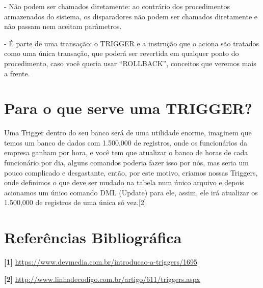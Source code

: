 \documentclass[12pt,a4paper]{article}
\begin{document}
 - Não podem ser chamados diretamente: ao contrário dos procedimentos armazenados do sistema, os disparadores não podem ser chamados diretamente e não passam nem aceitam parâmetros.
 
 - É parte de uma transação: o TRIGGER e a instrução que o aciona são tratados como uma única transação, que poderá ser revertida em qualquer ponto do procedimento, caso você queria usar “ROLLBACK”, conceitos que veremos mais a frente.

\section{Para o que serve uma TRIGGER?}
Uma Trigger dentro do seu banco será de uma utilidade enorme, imaginem que temos um banco de dados com 1.500,000 de registros, onde os funcionários da empresa ganham por hora, e você tem que atualizar o banco de horas de cada funcionário por dia, alguns comandos poderia fazer isso por nós, mas seria um pouco complicado e desgastante, então, por este motivo, criamos nossas Triggers, onde definimos o que deve ser mudado na tabela num único arquivo e depois acionamos um único comando DML (Update) para ele, assim, ele irá atualizar os 1.500,000 de registros de uma única só vez.[2]

\section{Referências Bibliográfica}
\noindent \textbf{[1]} \url {https://www.devmedia.com.br/introducao-a-triggers/1695}
\\\vspace{0.2cm}

\noindent \textbf{[2]} \url {http://www.linhadecodigo.com.br/artigo/611/triggers.aspx}
\end{document}
